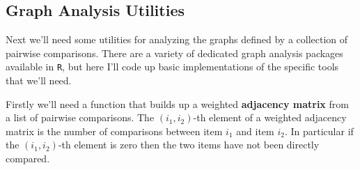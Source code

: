 \documentclass[
  letterpaper,
  DIV=11,
  numbers=noendperiod]{scrartcl}
\begin{document}
\subsection{Graph Analysis Utilities}\label{sec:graph-utils}

Next we'll need some utilities for analyzing the graphs defined by a
collection of pairwise comparisons. There are a variety of dedicated
graph analysis packages available in \texttt{R}, but here I'll code up
basic implementations of the specific tools that we'll need.

Firstly we'll need a function that builds up a weighted
\textbf{adjacency matrix} from a list of pairwise comparisons. The
\((i_{1}, i_{2})\)-th element of a weighted adjacency matrix is the
number of comparisons between item \(i_{1}\) and item \(i_{2}\). In
particular if the \((i_{1}, i_{2})\)-th element is zero then the two
items have not been directly compared.
\end{document}
